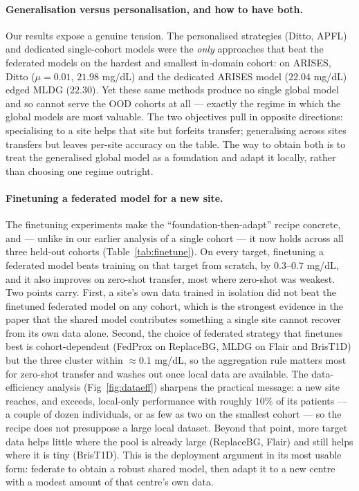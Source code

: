\documentclass[10pt,letterpaper]{article}
\begin{document}
\paragraph{Generalisation versus personalisation, and how to have both.} Our
results expose a genuine tension. The personalised strategies (Ditto, APFL) and
dedicated single-cohort models were the \emph{only} approaches that beat the
federated models on the hardest and smallest in-domain cohort: on ARISES, Ditto
($\mu{=}0.01$, $21.98$ mg/dL) and the dedicated ARISES model ($22.04$ mg/dL) edged
MLDG ($22.30$). Yet these same methods produce no single global model and so
cannot serve the OOD cohorts at all --- exactly the regime in which the global
models are most valuable. The two objectives pull in opposite directions:
specialising to a site helps that site but forfeits transfer; generalising across
sites transfers but leaves per-site accuracy on the table. The way to obtain both
is to treat the generalised global model as a foundation and adapt it locally,
rather than choosing one regime outright.

\paragraph{Finetuning a federated model for a new site.} The finetuning
experiments make the ``foundation-then-adapt'' recipe concrete, and --- unlike in
our earlier analysis of a single cohort --- it now holds across all three held-out
cohorts (Table~\ref{tab:finetune}). On every target, finetuning a federated model
beats training on that target from scratch, by $0.3$--$0.7$ mg/dL, and it also
improves on zero-shot transfer, most where zero-shot was weakest. Two points
carry. First, a site's own data trained in isolation did not beat the finetuned
federated model on any cohort, which is the strongest evidence in the paper that
the shared model contributes something a single site cannot recover from its own
data alone. Second, the choice of federated strategy that finetunes best is
cohort-dependent (FedProx on ReplaceBG, MLDG on Flair and BrisT1D) but the three
cluster within $\approx 0.1$ mg/dL, so the aggregation rule matters most for
zero-shot transfer and washes out once local data are available. The
data-efficiency analysis (Fig~\ref{fig:dataeff}) sharpens the practical message: a
new site reaches, and exceeds, local-only performance with roughly $10\%$ of its
patients --- a couple of dozen individuals, or as few as two on the smallest
cohort --- so the recipe does not presuppose a large local dataset. Beyond that
point, more target data helps little where the pool is already large (ReplaceBG,
Flair) and still helps where it is tiny (BrisT1D). This is the deployment argument
in its most usable form: federate to obtain a robust shared model, then adapt it
to a new centre with a modest amount of that centre's own data.
\end{document}
